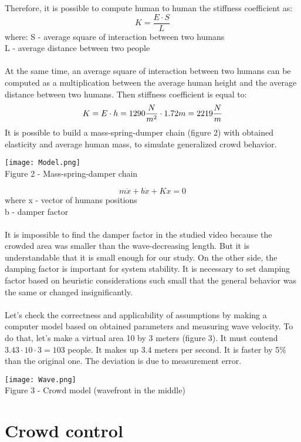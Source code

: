 \documentclass[12pt,a4paper]{report}
\begin{document}
Therefore, it is possible to compute human to human the stiffness coefficient as:
\[K = \frac{E\cdot S}{L}\]
where: S - average square of interaction between two humans\\
L - average distance between two people\\\\
At the same time, an average square of interaction between two humans can be computed as a multiplication between the average human height and the average distance between two humans. Then stiffness coefficient is equal to:
\[K = E \cdot h = 1290 \frac{N}{m\textsuperscript{2}} \cdot 1.72 m = 2219\frac{N}{m}\]
 It is possible to build a mass-spring-dumper chain (figure 2) with obtained elasticity and average human mass, to simulate generalized crowd behavior.
 \begin{center}
    \texttt{[image: Model.png]}\\
    Figure 2 - Mass-spring-damper chain
\end{center}
\[m \ddot x + b \dot x + Kx = 0\]
where x - vector of humans positions\\
b - damper factor\\\\
It is impossible to find the damper factor in the studied video because the crowded area was smaller than the wave-decreasing length. But it is understandable that it is small enough for our study. On the other side, the damping factor is important for system stability. It is necessary to set damping factor based on heuristic considerations such small that the general behavior was the same or changed insignificantly.\\\\
Let's check the correctness and applicability of assumptions by making a computer model based on obtained parameters and measuring wave velocity.
To do that, let's make a virtual area 10 by 3 meters (figure 3). It must contend $3.43\cdot10\cdot3=103$ people. It makes up 3.4 meters per second. It is faster by 5\% than the original one. The deviation is due to measurement error.
\begin{center}
    \texttt{[image: Wave.png]}\\
    Figure 3 - Crowd model (wavefront in the middle)
\end{center}
\chapter*{Crowd control}
\end{document}
